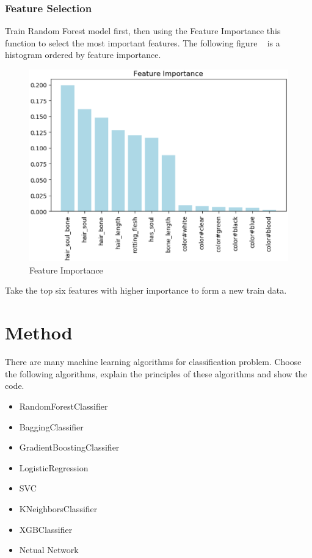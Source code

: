 \subsubsection{Feature Selection}


Train Random Forest model first, 
then using the Feature Importance this function 
to select the most important features. 
The following figure ~
is a histogram ordered by feature importance. 


\begin{figure}[htbp]
	\centering
	\includegraphics[scale=0.3]{figures/FEATURE.eps}
	\caption{Feature Importance}\label{fig:feature_importance}
\end{figure}

Take the top six features 
with higher importance 
to form a new train data.


\section{Method}

There are many machine learning algorithms 
for classification problem. 
Choose the following algorithms, 
explain the principles of
these algorithms and 
show the code.

\begin{itemize}
	\item RandomForestClassifier
	\item BaggingClassifier
	\item GradientBoostingClassifier
	\item LogisticRegression
	\item SVC
	\item KNeighborsClassifier 
	\item XGBClassifier
	\item Netual Network
\end{itemize}

